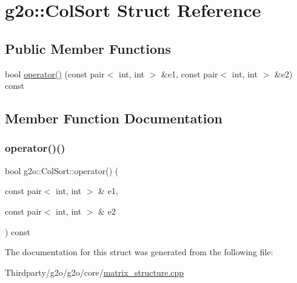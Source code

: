 \hypertarget{structg2o_1_1_col_sort}{}\section{g2o\+:\+:Col\+Sort Struct Reference}
\label{structg2o_1_1_col_sort}
\subsection*{Public Member Functions}
\begin{DoxyCompactItemize}
\item 
bool \mbox{\hyperlink{structg2o_1_1_col_sort_a47d0b6b7473c362d20f10becf55919dc}{operator()}} (const pair$<$ int, int $>$ \&e1, const pair$<$ int, int $>$ \&e2) const
\end{DoxyCompactItemize}


\subsection{Member Function Documentation}
\mbox{\label{structg2o_1_1_col_sort_a47d0b6b7473c362d20f10becf55919dc}} 
\subsubsection{\texorpdfstring{operator()()}{operator()()}}
{\footnotesize\ttfamily bool g2o\+::\+Col\+Sort\+::operator() (\begin{DoxyParamCaption}\item[{const pair$<$ int, int $>$ \&}]{e1,  }\item[{const pair$<$ int, int $>$ \&}]{e2 }\end{DoxyParamCaption}) const\hspace{0.3cm}{\ttfamily [inline]}}



The documentation for this struct was generated from the following file\+:\begin{DoxyCompactItemize}
\item 
Thirdparty/g2o/g2o/core/\mbox{\hyperlink{matrix__structure_8cpp}{matrix\+\_\+structure.\+cpp}}\end{DoxyCompactItemize}
